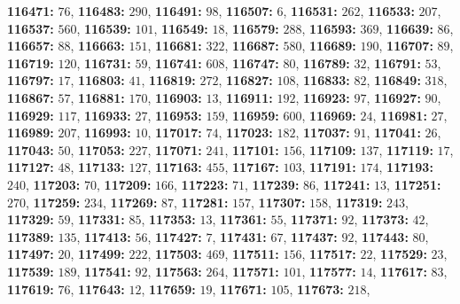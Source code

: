 \textsf{\bfseries 116471:} $76$, \textsf{\bfseries 116483:} $290$, \textsf{\bfseries 116491:} $98$, \textsf{\bfseries 116507:} $6$, \textsf{\bfseries 116531:} $262$, \textsf{\bfseries 116533:} $207$, \textsf{\bfseries 116537:} $560$, \textsf{\bfseries 116539:} $101$, \textsf{\bfseries 116549:} $18$, \textsf{\bfseries 116579:} $288$, \textsf{\bfseries 116593:} $369$, \textsf{\bfseries 116639:} $86$, \textsf{\bfseries 116657:} $88$, \textsf{\bfseries 116663:} $151$, \textsf{\bfseries 116681:} $322$, \textsf{\bfseries 116687:} $580$, \textsf{\bfseries 116689:} $190$, \textsf{\bfseries 116707:} $89$, \textsf{\bfseries 116719:} $120$, \textsf{\bfseries 116731:} $59$, \textsf{\bfseries 116741:} $608$, \textsf{\bfseries 116747:} $80$, \textsf{\bfseries 116789:} $32$, \textsf{\bfseries 116791:} $53$, \textsf{\bfseries 116797:} $17$, \textsf{\bfseries 116803:} $41$, \textsf{\bfseries 116819:} $272$, \textsf{\bfseries 116827:} $108$, \textsf{\bfseries 116833:} $82$, \textsf{\bfseries 116849:} $318$, \textsf{\bfseries 116867:} $57$, \textsf{\bfseries 116881:} $170$, \textsf{\bfseries 116903:} $13$, \textsf{\bfseries 116911:} $192$, \textsf{\bfseries 116923:} $97$, \textsf{\bfseries 116927:} $90$, \textsf{\bfseries 116929:} $117$, \textsf{\bfseries 116933:} $27$, \textsf{\bfseries 116953:} $159$, \textsf{\bfseries 116959:} $600$, \textsf{\bfseries 116969:} $24$, \textsf{\bfseries 116981:} $27$, \textsf{\bfseries 116989:} $207$, \textsf{\bfseries 116993:} $10$, \textsf{\bfseries 117017:} $74$, \textsf{\bfseries 117023:} $182$, \textsf{\bfseries 117037:} $91$, \textsf{\bfseries 117041:} $26$, \textsf{\bfseries 117043:} $50$, \textsf{\bfseries 117053:} $227$, \textsf{\bfseries 117071:} $241$, \textsf{\bfseries 117101:} $156$, \textsf{\bfseries 117109:} $137$, \textsf{\bfseries 117119:} $17$, \textsf{\bfseries 117127:} $48$, \textsf{\bfseries 117133:} $127$, \textsf{\bfseries 117163:} $455$, \textsf{\bfseries 117167:} $103$, \textsf{\bfseries 117191:} $174$, \textsf{\bfseries 117193:} $240$, \textsf{\bfseries 117203:} $70$, \textsf{\bfseries 117209:} $166$, \textsf{\bfseries 117223:} $71$, \textsf{\bfseries 117239:} $86$, \textsf{\bfseries 117241:} $13$, \textsf{\bfseries 117251:} $270$, \textsf{\bfseries 117259:} $234$, \textsf{\bfseries 117269:} $87$, \textsf{\bfseries 117281:} $157$, \textsf{\bfseries 117307:} $158$, \textsf{\bfseries 117319:} $243$, \textsf{\bfseries 117329:} $59$, \textsf{\bfseries 117331:} $85$, \textsf{\bfseries 117353:} $13$, \textsf{\bfseries 117361:} $55$, \textsf{\bfseries 117371:} $92$, \textsf{\bfseries 117373:} $42$, \textsf{\bfseries 117389:} $135$, \textsf{\bfseries 117413:} $56$, \textsf{\bfseries 117427:} $7$, \textsf{\bfseries 117431:} $67$, \textsf{\bfseries 117437:} $92$, \textsf{\bfseries 117443:} $80$, \textsf{\bfseries 117497:} $20$, \textsf{\bfseries 117499:} $222$, \textsf{\bfseries 117503:} $469$, \textsf{\bfseries 117511:} $156$, \textsf{\bfseries 117517:} $22$, \textsf{\bfseries 117529:} $23$, \textsf{\bfseries 117539:} $189$, \textsf{\bfseries 117541:} $92$, \textsf{\bfseries 117563:} $264$, \textsf{\bfseries 117571:} $101$, \textsf{\bfseries 117577:} $14$, \textsf{\bfseries 117617:} $83$, \textsf{\bfseries 117619:} $76$, \textsf{\bfseries 117643:} $12$, \textsf{\bfseries 117659:} $19$, \textsf{\bfseries 117671:} $105$, \textsf{\bfseries 117673:} $218$, 
